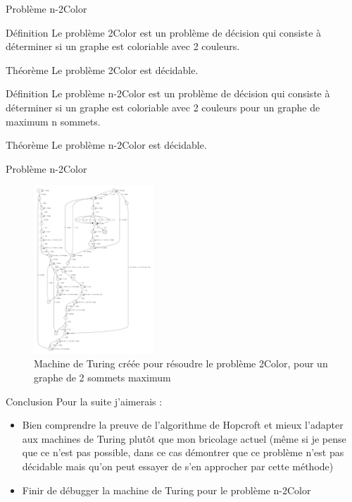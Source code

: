 \documentclass{beamer}
\begin{document}
    \begin{frame}{Problème n-2Color}
        \begin{alert}{Définition}
            Le problème 2Color est un problème de décision qui consiste à déterminer 
            si un graphe est coloriable avec 2 couleurs. 
        \end{alert}
        \begin{block}{Théorème}
            Le problème 2Color est décidable.
        \end{block}
        \begin{alert}{Définition}
            Le problème n-2Color est un problème de décision qui consiste à déterminer 
            si un graphe est coloriable avec 2 couleurs pour un graphe de maximum n sommets.
        \end{alert}
        \begin{block}{Théorème}
            Le problème n-2Color est décidable.
        \end{block}
    \end{frame}
    \begin{frame}{Problème n-2Color}
        \begin{figure}
            \includegraphics[width=0.4\textwidth]{images/MT_2Color_2.pdf}
            \caption{Machine de Turing créée pour résoudre le problème 2Color,
            pour un graphe de 2 sommets maximum}
        \end{figure}
    \end{frame}
    \begin{frame}{Conclusion}
        Pour la suite j'aimerais :
        \begin{itemize}
            \item Bien comprendre la preuve de l'algorithme de Hopcroft et mieux 
            l'adapter aux machines de Turing plutôt que mon bricolage actuel (même 
            si je pense que ce n'est pas possible, dans ce cas démontrer que ce problème
            n'est pas décidable mais qu'on peut essayer de s'en approcher par cette méthode)
            \item Finir de débugger la machine de Turing pour le problème n-2Color 
        \end{itemize}
    \end{frame}
\end{document}
